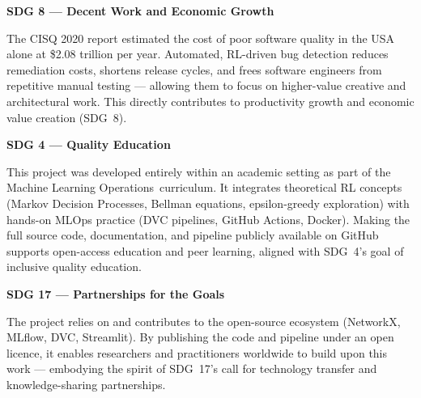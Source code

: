 \documentclass[12pt,a4paper]{report}
\newcommand{\coursename}{Machine Learning Operations}
\begin{document}
\textbf{SDG 8 --- Decent Work and Economic Growth}

The CISQ 2020 report estimated the cost of poor software quality in the
USA alone at \$2.08 trillion per year.  Automated, RL-driven bug
detection reduces remediation costs, shortens release cycles, and frees
software engineers from repetitive manual testing --- allowing them to
focus on higher-value creative and architectural work.  This directly
contributes to productivity growth and economic value creation (SDG~8).

\vspace{0.3cm}

\textbf{SDG 4 --- Quality Education}

This project was developed entirely within an academic setting as part of
the \coursename\ curriculum.  It integrates theoretical RL concepts
(Markov Decision Processes, Bellman equations, epsilon-greedy
exploration) with hands-on MLOps practice (DVC pipelines, GitHub
Actions, Docker).  Making the full source code, documentation, and
pipeline publicly available on GitHub supports open-access education and
peer learning, aligned with SDG~4's goal of inclusive quality education.

\vspace{0.3cm}

\textbf{SDG 17 --- Partnerships for the Goals}

The project relies on and contributes to the open-source ecosystem
(NetworkX, MLflow, DVC, Streamlit).  By publishing the code and pipeline
under an open licence, it enables researchers and practitioners worldwide
to build upon this work --- embodying the spirit of SDG~17's call for
technology transfer and knowledge-sharing partnerships.
\end{document}
